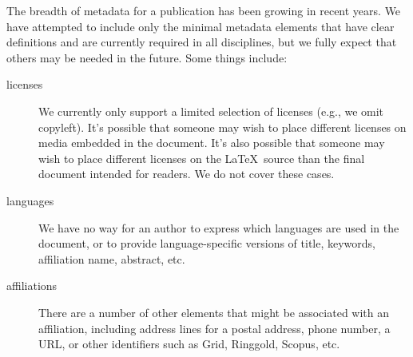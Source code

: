 \documentclass{article}
\begin{document}
The breadth of metadata for a publication has been growing in recent years.
We have attempted to include only the minimal metadata elements that have clear
definitions and are currently required in all disciplines, but we fully expect
that others may be needed in the future. Some things include:
\begin{description}
\item[licenses] We currently only support a limited selection of licenses (e.g., we omit
copyleft). It's possible that someone may wish to place different licenses on media embedded
in the document. It's also possible that someone may wish to place different licenses on the \LaTeX\ source
than the final document intended for readers. We do not cover these cases.
\item[languages] We have no way for an author to express which languages are used in the document,
or to provide language-specific versions of title, keywords, affiliation name, abstract, etc.
\item[affiliations] There are a number of other elements that might be associated with an affiliation,
including address lines for a postal address, phone number, a URL, or other identifiers such as
Grid, Ringgold, Scopus, etc.


\end{description}
\end{document}
